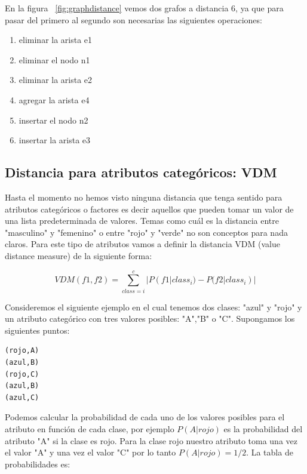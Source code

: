 En la figura ~\ref{fig:graphdistance} vemos dos grafos a distancia 6, ya que para pasar del primero al segundo son necesarias las siguientes operaciones:

\begin{enumerate}
\item eliminar la arista e1
\item eliminar el nodo n1
\item eliminar la arista e2
\item agregar la arista e4
\item insertar el nodo n2
\item insertar la arista e3
\end{enumerate}

\subsection{Distancia para atributos categóricos: VDM}
Hasta el momento no hemos visto ninguna distancia que tenga sentido para atributos categóricos o factores es decir aquellos que pueden tomar un valor de una lista predeterminada de valores. Temas como cuál es la distancia entre "masculino" y "femenino" o entre "rojo" y "verde" no son conceptos para nada claros. Para este tipo de atributos vamos a definir la distancia VDM (value distance measure) de la siguiente forma:

$$VDM(f1,f2) = \sum_{class=i}^{c} |P(f1|class_i)-P(f2|class_i)|$$

Consideremos el siguiente ejemplo en el cual tenemos dos clases: "azul" y "rojo" y un atributo categórico con tres valores posibles: "A","B" o "C". Supongamos los siguientes puntos:

\begin{verbatim}
(rojo,A)
(azul,B)
(rojo,C)
(azul,B)
(azul,C)
\end{verbatim}

Podemos calcular la probabilidad de cada uno de los valores posibles para el atributo en función de cada clase, por ejemplo $P(A|rojo)$ es la probabilidad del atributo "A" si la clase es rojo. Para la clase rojo nuestro atributo toma una vez el valor "A" y una vez el valor "C" por lo tanto $P(A|rojo)=1/2$. La tabla de probabilidades es:

\begin{table}[!hbt]
\vskip 0.25cm
\caption{Probabilidades de factores.}
\end{table}

